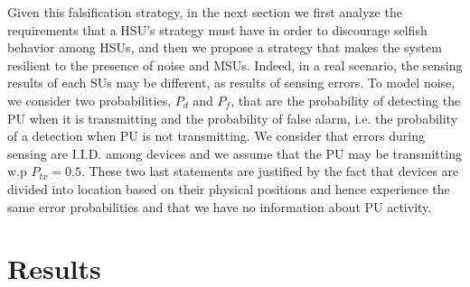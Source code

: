 \documentclass[letterpaper, 10 pt, conference]{ieeeconf}  %
\begin{document}
Given this falsification strategy, in the next section we first analyze the requirements that a HSU's strategy must have in order to discourage selfish behavior among HSUs, and then we propose a strategy that makes the system resilient to the presence of noise and MSUs. Indeed, in a real scenario, the sensing results of each SUs may be different, as results of sensing errors. To model noise, we consider two probabilities, $P_d$ and $P_f$, that are the probability of detecting the PU when it is transmitting and the probability of false alarm, i.e. the probability of a detection when PU is not transmitting\cite{digham}. We consider that errors during sensing are I.I.D. among devices and we assume that the PU may be transmitting w.p $P_{tx}=0.5$. These two last statements are justified by the fact that devices are divided into location based on their physical positions and hence experience the same error probabilities\cite{digham} and that we have no information about PU activity.
\section{Results}
\label{sec4}
\end{document}
